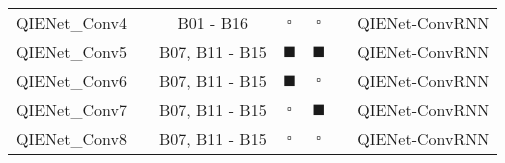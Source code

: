 \begin{table}[H]
{\begin{tabular}{ccccccc}
            QIENet\_Conv4          &  & B01 - B16                     & $\square$      & $\square$                   &  & QIENet-ConvRNN \\
            QIENet\_Conv5          &  & B07, B11 - B15             & $\blacksquare$ & $\blacksquare$              &  & QIENet-ConvRNN \\
            QIENet\_Conv6          &  & B07, B11 - B15             & $\blacksquare$ & $\square$                   &  & QIENet-ConvRNN \\
            QIENet\_Conv7          &  & B07, B11 - B15             & $\square$      & $\blacksquare$              &  & QIENet-ConvRNN \\
            QIENet\_Conv8          &  & B07, B11 - B15             & $\square$      & $\square$                   &  & QIENet-ConvRNN \\ \hline
        \end{tabular}
    }
    \label{table:model_inputs}
\end{table}